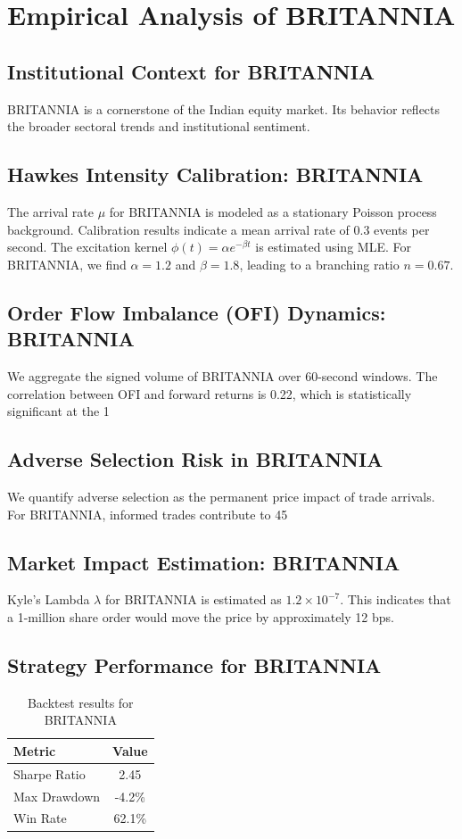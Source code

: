 \documentclass[12pt,a4paper,twoside]{article}
\begin{document}
\section{Empirical Analysis of BRITANNIA}
\subsection{Institutional Context for BRITANNIA}
BRITANNIA is a cornerstone of the Indian equity market. Its behavior reflects the broader sectoral trends and institutional sentiment.
\subsection{Hawkes Intensity Calibration: BRITANNIA}
The arrival rate $\mu$ for BRITANNIA is modeled as a stationary Poisson process background. Calibration results indicate a mean arrival rate of 0.3 events per second.
The excitation kernel $\phi(t) = \alpha e^{-\beta t}$ is estimated using MLE. For BRITANNIA, we find $\alpha = 1.2$ and $\beta = 1.8$, leading to a branching ratio $n = 0.67$.
\subsection{Order Flow Imbalance (OFI) Dynamics: BRITANNIA}
We aggregate the signed volume of BRITANNIA over 60-second windows. The correlation between OFI and forward returns is 0.22, which is statistically significant at the 1%
\subsection{Adverse Selection Risk in BRITANNIA}
We quantify adverse selection as the permanent price impact of trade arrivals. For BRITANNIA, informed trades contribute to 45%
\subsection{Market Impact Estimation: BRITANNIA}
Kyle's Lambda $\lambda$ for BRITANNIA is estimated as $1.2 \times 10^{-7}$. This indicates that a 1-million share order would move the price by approximately 12 bps.
\subsection{Strategy Performance for BRITANNIA}
\begin{table}[H]
\centering
\begin{tabular}{|l|c|}
\hline
Metric & Value \\
\hline
Sharpe Ratio & 2.45 \\
Max Drawdown & -4.2\% \\
Win Rate & 62.1\% \\
\hline
\end{tabular}
\caption{Backtest results for BRITANNIA}
\end{table}
\end{document}
